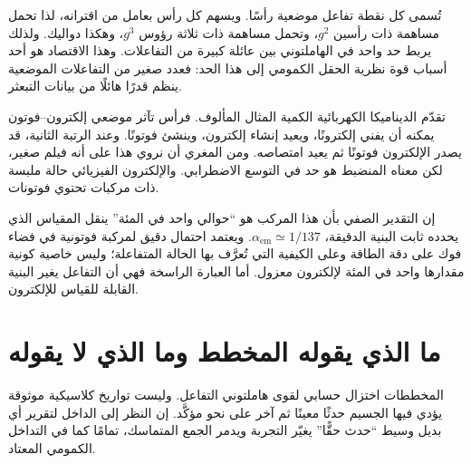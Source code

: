 تُسمى كل نقطة تفاعل موضعية رأسًا. ويسهم كل رأس بعامل من اقترانه، لذا تحمل مساهمة ذات رأسين \(g^2\)، وتحمل مساهمة ذات ثلاثة رؤوس \(g^3\)، وهكذا دواليك. ولذلك يربط حد واحد في الهاملتوني بين عائلة كبيرة من التفاعلات. وهذا الاقتصاد هو أحد أسباب قوة نظرية الحقل الكمومي إلى هذا الحد: فعدد صغير من التفاعلات الموضعية ينظم قدرًا هائلًا من بيانات التبعثر.

\begin{classroomqa}
\end{classroomqa}

تقدّم الديناميكا الكهربائية الكمية المثال المألوف. فرأس تآثر موضعي إلكترون--فوتون يمكنه أن يفني إلكترونًا، ويعيد إنشاء إلكترون، وينشئ فوتونًا. وعند الرتبة الثانية، قد يصدر الإلكترون فوتونًا ثم يعيد امتصاصه. ومن المغري أن نروي هذا على أنه فيلم صغير، لكن معناه المنضبط هو حد في التوسع الاضطرابي. والإلكترون الفيزيائي حالة ملبسة ذات مركبات تحتوي فوتونات.

إن التقدير الصفي بأن هذا المركب هو ``حوالي واحد في المئة'' ينقل المقياس الذي يحدده ثابت البنية الدقيقة، \(\alpha_{\mathrm{em}}\simeq 1/137\). ويعتمد احتمال دقيق لمركبة فوتونية في فضاء فوك على دقة الطاقة وعلى الكيفية التي تُعرَّف بها الحالة المتفاعلة؛ وليس خاصية كونية مقدارها واحد في المئة لإلكترون معزول. أما العبارة الراسخة فهي أن التفاعل يغير البنية القابلة للقياس للإلكترون.

\section{ما الذي يقوله المخطط وما الذي لا يقوله}

المخططات اختزال حسابي لقوى هاملتوني التفاعل. وليست تواريخ كلاسيكية موثوقة يؤدي فيها الجسيم حدثًا معينًا ثم آخر على نحو مؤكَّد. إن النظر إلى الداخل لتقرير أي بديل وسيط ``حدث حقًّا'' يغيّر التجربة ويدمر الجمع المتماسك، تمامًا كما في التداخل الكمومي المعتاد.

\begin{classroomqa}
\end{classroomqa}

